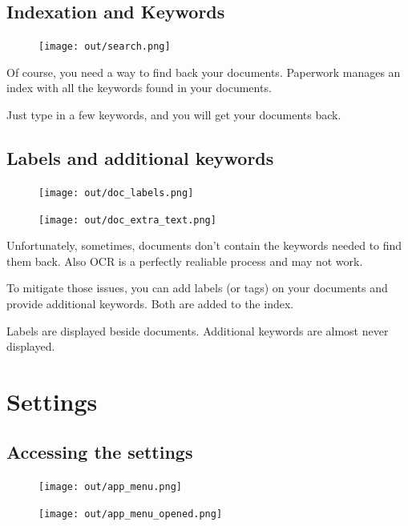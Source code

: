\documentclass[10pt,a4paper]{article}
\begin{document}
\subsection{Indexation and Keywords}

\begin{figure}[H]
	\texttt{[image: out/search.png]}
\end{figure}

Of course, you need a way to find back your documents. Paperwork manages an
index with all the keywords found in your documents.

Just type in a few keywords, and you will get your documents back.


\subsection{Labels and additional keywords}

\begin{figure}[H]
	\centering
	\begin{minipage}{.5\textwidth}
		\centering
		\texttt{[image: out/doc\_labels.png]}
	\end{minipage}%
	\begin{minipage}{.5\textwidth}
		\centering
		\texttt{[image: out/doc\_extra\_text.png]}
	\end{minipage}
\end{figure}

Unfortunately, sometimes, documents don't contain the keywords needed to find
them back. Also OCR is a perfectly realiable process and may not work.

To mitigate those issues, you can add labels (or tags) on your documents and
provide additional keywords. Both are added to the index.

Labels are displayed beside documents. Additional keywords are almost never
displayed.


\section{Settings}

\subsection{Accessing the settings}

\begin{figure}[H]
	\centering
	\begin{minipage}{.5\textwidth}
		\centering
		\texttt{[image: out/app\_menu.png]}
	\end{minipage}%
	\begin{minipage}{.5\textwidth}
		\centering
		\texttt{[image: out/app\_menu\_opened.png]}
	\end{minipage}
\end{figure}
\end{document}
